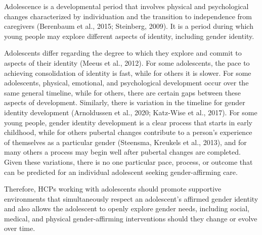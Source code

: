 \documentclass[
]{book}
\begin{document}
Adolescence is a developmental period that
involves physical and psychological changes characterized by individuation and the transition to
independence from caregivers (Berenbaum et al.,
2015; Steinberg, 2009). It is a period during
which young people may explore different aspects
of identity, including gender identity.

Adolescents differ regarding the degree to
which they explore and commit to aspects of
their identity (Meeus et al., 2012). For some adolescents, the pace to achieving consolidation of
identity is fast, while for others it is slower. For
some adolescents, physical, emotional, and psychological development occur over the same general timeline, while for others, there are certain
gaps between these aspects of development.
Similarly, there is variation in the timeline for
gender identity development (Arnoldussen et al.,
2020; Katz-Wise et al., 2017). For some young
people, gender identity development is a clear
process that starts in early childhood, while for
others pubertal changes contribute to a person's
experience of themselves as a particular gender
(Steensma, Kreukels et al., 2013), and for many
others a process may begin well after pubertal
changes are completed. Given these variations,
there is no one particular pace, process, or outcome that can be predicted for an individual
adolescent seeking gender-affirming care.

Therefore, HCPs working with adolescents
should promote supportive environments that
simultaneously respect an adolescent's affirmed
gender identity and also allows the adolescent to
openly explore gender needs, including social,
medical, and physical gender-affirming interventions should they change or evolve over time.
\end{document}
